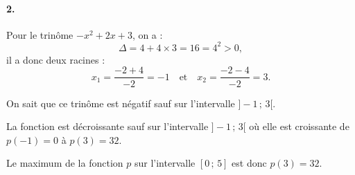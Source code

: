 \paragraph{2.} Pour le trinôme \( -x^2 + 2x + 3 \), on a :
\[
\Delta = 4 + 4 \times 3 = 16 = 4^2 > 0,
\]
il a donc deux racines :
\[
x_1 = \dfrac{-2 + 4}{-2} = -1 \quad \text{et} \quad x_2 = \dfrac{-2 - 4}{-2} = 3.
\]

On sait que ce trinôme est négatif sauf sur l'intervalle \( ]-1 \,;\, 3[ \).

La fonction est décroissante sauf sur l'intervalle \( ]-1 \,;\, 3[ \) où elle est croissante de \( p(-1) = 0 \) à \( p(3) = 32 \).

Le maximum de la fonction \( p \) sur l'intervalle \( [0 \,;\, 5] \) est donc \( p(3) = 32 \).
